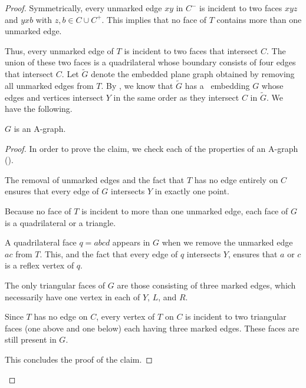 \begin{proof}
	Symmetrically, every unmarked edge $xy$ in $C^-$ is incident to two faces
	$xyz$ and $yxb$ with $z,b\in C \cup C^+$.  This implies that no face of $T$ contains more than one unmarked edge.
	
	Thus, every unmarked edge of $T$ is incident to two faces that intersect $C$. The union of these two faces is a quadrilateral whose boundary consists of four edges that intersect $C$.
	Let $\tilde{G}$ denote the embedded plane graph obtained by removing all unmarked edges
	from $T$.  By , we know that $\tilde G$ has
	a \Fary\ embedding $G$ whose edges and vertices intersect $Y$ in the
	same order as they intersect $C$ in $\tilde{G}$. We have the following.
	
	\begin{claimx} \label{claim-a-graph}
		$G$ is an A-graph.
	\end{claimx}
	
	\begin{proof}
In order to	prove the claim, we check each of the properties of an A-graph
	().
	\begin{compactenum}
		\item The removal of unmarked edges and the fact that $T$ has no
		edge entirely on $C$ ensures that every edge of $G$ intersects $Y$
		in exactly one point.
		\item Because no face of $T$ is incident to more than one unmarked edge,
		each face of $G$ is a quadrilateral or a triangle.  
		\item A quadrilateral face $q=abcd$ appears in $G$ when we remove the unmarked edge $ac$ from $T$. This, and the fact that every edge of $q$ intersects $Y$, ensures that $a$ or $c$ is a reflex vertex of $q$.
		\item The only triangular faces of $G$ are those consisting
		of three marked edges, which necessarily have one vertex in
		each of $Y$, $L$, and $R$.
		\item Since $T$ has no edge on $C$, every vertex of $T$ on $C$
		is incident to two triangular faces (one above and one below)
		each having three marked edges. These faces are still present in $G$.
	\end{compactenum}
This concludes the proof of the claim.
\end{proof}	


\end{proof}
